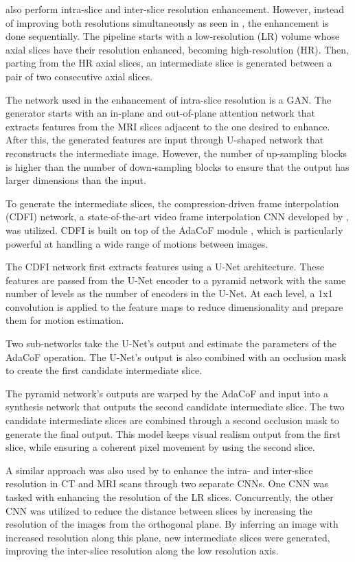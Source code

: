 \textcite{Nimitha2024} also perform intra-slice and inter-slice resolution enhancement. However, instead of improving both resolutions simultaneously as seen in \textcite{Zhang2024, Fang2022}, the enhancement is done sequentially. The pipeline starts with a low-resolution (LR) volume whose axial slices have their resolution enhanced, becoming high-resolution (HR). Then, parting from the HR axial slices, an intermediate slice is generated between a pair of two consecutive axial slices.
\par
The network used in the enhancement of intra-slice resolution is a GAN. The generator starts with an in-plane and out-of-plane attention network that extracts features from the MRI slices adjacent to the one desired to enhance. After this, the generated features are input through U-shaped network that reconstructs the intermediate image. However, the number of up-sampling blocks is higher than the number of down-sampling blocks to ensure that the output has larger dimensions than the input.
\par
To generate the intermediate slices, the compression-driven frame interpolation (CDFI) network, a state-of-the-art video frame interpolation CNN developed by \textcite{Ding2021}, was utilized. CDFI is built on top of the AdaCoF module \parencite{Lee2020}, which is particularly powerful at handling a wide range of motions between images.
\par 
The CDFI network first extracts features using a U-Net architecture. These features are passed from the U-Net encoder to a pyramid network with the same number of levels as the number of encoders in the U-Net. At each level, a 1x1 convolution is applied to the feature maps to reduce dimensionality and prepare them for motion estimation.
\par
Two sub-networks take the U-Net's output and estimate the parameters of the AdaCoF operation. The U-Net's output is also combined with an occlusion mask to create the first candidate intermediate slice.
\par
The pyramid network's outputs are warped by the AdaCoF and input into a synthesis network that outputs the second candidate intermediate slice. The two candidate intermediate slices are combined through a second occlusion mask to generate the final output. This model keeps visual realism output from the first slice, while ensuring a coherent pixel movement by using the second slice.
\par
A similar approach was also used by \textcite{Georgescu2020} to enhance the intra- and inter-slice resolution in CT and MRI scans through two separate CNNs. One CNN was tasked with enhancing the resolution of the LR slices. Concurrently, the other CNN was utilized to reduce the distance between slices by increasing the resolution of the images from the orthogonal plane. By inferring an image with increased resolution along this plane, new intermediate slices were generated, improving the inter-slice resolution along the low resolution axis.

